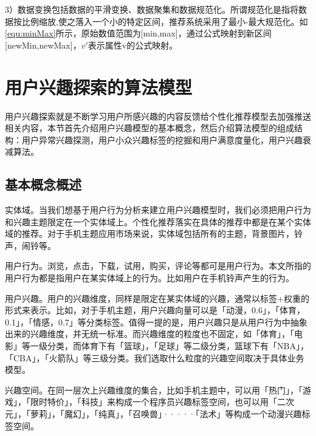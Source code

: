   3）数据变换包括数据的平滑变换、数据聚集和数据规范化。所谓规范化是指将数据按比例缩放,使之落入一个小的特定区间，推荐系统采用了最小-最大规范化。如\autoref{equ:minMax}所示，原始数值范围为[min,max]，通过公式映射到新区间[newMin,newMax]，$v'$表示属性v的公式映射。

\section{用户兴趣探索的算法模型}
用户兴趣探索就是不断学习用户所感兴趣的内容反馈给个性化推荐模型去加强推送相关内容，本节首先介绍用户兴趣模型的基本概念，然后介绍算法模型的组成结构：用户异常兴趣探测，用户小众兴趣标签的挖掘和用户满意度量化，用户兴趣衰减算法。

  \subsection{基本概念概述}
  实体域。当我们想基于用户行为分析来建立用户兴趣模型时，我们必须把用户行为和兴趣主题限定在一个实体域上。个性化推荐落实在具体的推荐中都是在某个实体域的推荐。对于手机主题应用市场来说，实体域包括所有的主题，背景图片，铃声，闹铃等。

  用户行为。浏览，点击，下载，试用，购买，评论等都可是用户行为。本文所指的用户行为都是指用户在某实体域上的行为。比如用户在手机铃声产生的行为。
  
  用户兴趣。用户的兴趣维度，同样是限定在某实体域的兴趣，通常以标签+权重的形式来表示。比如，对于手机主题，用户兴趣向量可以是「动漫，0.6」，「体育，0.1」，「情感，0.7」等分类标签。值得一提的是，用户兴趣只是从用户行为中抽象出来的兴趣维度，并无统一标准。而兴趣维度的粒度也不固定，如「体育」，「电影」等一级分类，而体育下有「篮球」，「足球」等二级分类，篮球下有「NBA」，「CBA」，「火箭队」等三级分类。我们选取什么粒度的兴趣空间取决于具体业务模型。

  兴趣空间。在同一层次上兴趣维度的集合，比如手机主题中，可以用「热门」，「游戏」，「限时特价」，「科技」来构成一个程序员兴趣标签空间，也可以用「二次元」，「萝莉」，「魔幻」，「纯真」，「召唤兽」·····「法术」等构成一个动漫兴趣标签空间。


